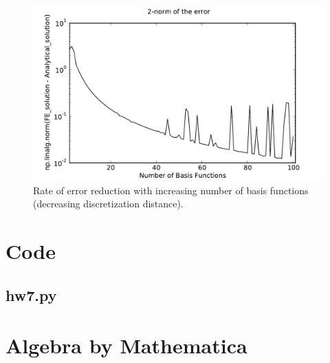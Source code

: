 \documentclass[10pt]{article}
\newcommand{\code}[2]{
    \subsection*{#1}
    
    \vspace{2em}
}
\begin{document}
\begin{figure}[ht]
    \centering
    \includegraphics[width=\columnwidth,keepaspectratio=true]{./hw7-error_rate.pdf}
    \caption{Rate of error reduction with increasing number of basis functions (decreasing discretization distance).}
    \label{fig:errorrate}
\end{figure}

\clearpage

\section{Code}
\label{sec:code}

\code{hw7.py}{hw7.py}

\section{Algebra by Mathematica}
\label{sec:mathematica}

% 
\end{document}
